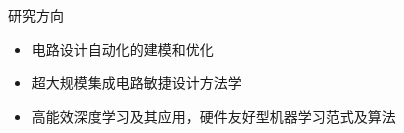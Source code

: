 
\begin{rSection}{研究方向}
\begin{itemize}
    \item 电路设计自动化的建模和优化
    \item 超大规模集成电路敏捷设计方法学
    \item 高能效深度学习及其应用，硬件友好型机器学习范式及算法
\end{itemize}
\end{rSection}

\iffalse
\begin{rSection}{Research Topics}
	\begin{itemize}
		\item Layout Optimization  \\%
		 - Propose a framework to combine layout decomposition and mask optimization into one stage.
		\item Standard Cell Synthesis   \\%
		 - Develop an algorithm of generating standard cell layouts of regular style.
		\item Adder Synthesis  \\%
		 - Propose a machine learning based methodology to search for best performance-area/power trade-off adders.
	\end{itemize}
\end{rSection}
\fi


